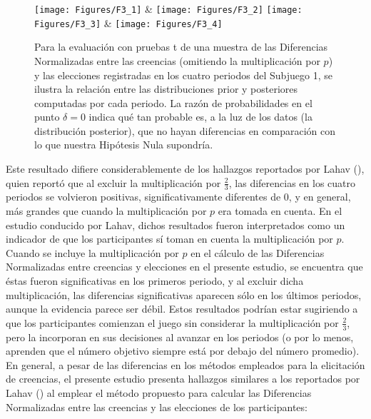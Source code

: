 \begin{figure}[hp]
\centering
\texttt{[image: Figures/F3\_1]} & \texttt{[image: Figures/F3\_2]} 
\texttt{[image: Figures/F3\_3]} & \texttt{[image: Figures/F3\_4]} 
\decoRule
\caption[Diferencias Normalizadas entre creencias y elecciones en el Subjuegoo 1, omitiendo la multiplicación por $p$ (Factor de Bayes)]{Para la evaluación con pruebas t de una muestra de las Diferencias Normalizadas entre las creencias (omitiendo la multiplicación por $p$) y las elecciones registradas en los cuatro periodos del Subjuego 1, se ilustra la relación entre las distribuciones prior y posteriores computadas por cada periodo. La razón de probabilidades en el punto $\delta = 0$ indica qué tan probable es, a la luz de los datos (la distribución posterior), que no hayan diferencias en comparación con lo que nuestra Hipótesis Nula supondría.}
\label{fig:DNnop_S1}
\end{figure}

Este resultado difiere considerablemente de los hallazgos reportados por Lahav (\citeyear{Lahav}), quien reportó que al excluir la multiplicación por $\frac{2}{3}$, las diferencias en los cuatro periodos se volvieron positivas, significativamente diferentes de 0, y en general, más grandes que cuando la multiplicación por $p$ era tomada en cuenta. En el estudio conducido por Lahav, dichos resultados fueron interpretados como un indicador de que los participantes sí toman en cuenta la multiplicación por $p$.\\

Cuando se incluye la multiplicación por $p$ en el cálculo de las Diferencias Normalizadas entre creencias y elecciones en el presente estudio, se encuentra que éstas fueron significativas en los primeros periodo, y al excluir dicha multiplicación, las diferencias significativas aparecen sólo en los últimos periodos, aunque la evidencia parece ser débil. Estos resultados podrían estar sugiriendo a que los participantes comienzan el juego sin considerar la multiplicación por $\frac{2}{3}$, pero la incorporan en sus decisiones al avanzar en los periodos (o por lo menos, aprenden que el número objetivo siempre está por debajo del número promedio).\\

En general, a pesar de las diferencias en los métodos empleados para la elicitación de creencias, el presente estudio presenta hallazgos similares a los reportados por Lahav (\citeyear{Lahav}) al emplear el método propuesto para calcular las Diferencias Normalizadas entre las creencias y las elecciones de los participantes:\\

